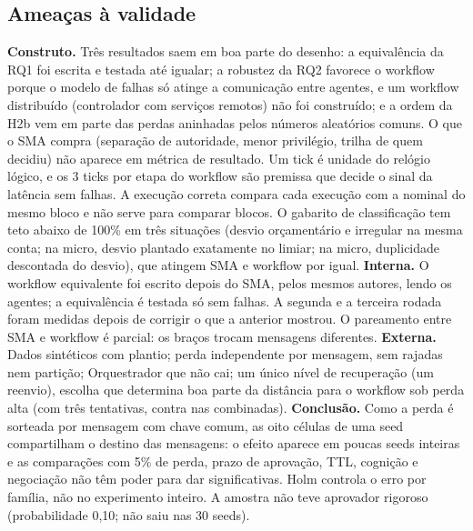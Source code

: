 \documentclass[10pt,a4paper]{article}
\begin{document}
\subsection{Ameaças à validade}\label{sec:ameacas}
\textbf{Construto.} Três resultados saem em boa parte do desenho: a equivalência da RQ1 foi escrita e testada até
igualar; a robustez da RQ2 favorece o workflow porque o modelo de falhas só atinge a comunicação entre agentes, e um
workflow distribuído (controlador com serviços remotos) não foi construído; e a ordem da H2b vem em parte das perdas
aninhadas pelos números aleatórios comuns. O que o SMA compra (separação de autoridade, menor privilégio, trilha de quem
decidiu) não aparece em métrica de resultado. Um tick é unidade do relógio lógico, e os 3 ticks por etapa do workflow são
premissa que decide o sinal da latência sem falhas. A execução correta compara cada execução com a nominal do mesmo
bloco e não serve para comparar blocos. O gabarito de classificação tem teto abaixo de 100\% em três
situações (desvio orçamentário e irregular na mesma conta; na micro, desvio plantado exatamente no limiar; na micro,
duplicidade descontada do desvio), que atingem SMA e workflow por igual. \textbf{Interna.} O workflow equivalente foi
escrito depois do SMA, pelos mesmos autores, lendo os agentes; a equivalência é testada só sem falhas. A segunda e a
terceira rodada foram medidas depois de corrigir o que a anterior mostrou. O pareamento entre SMA e workflow é parcial: os braços trocam mensagens
diferentes. \textbf{Externa.} Dados sintéticos com plantio; perda independente por mensagem, sem rajadas nem partição;
Orquestrador que não cai; um único nível de recuperação (um reenvio), escolha que determina boa parte da distância para
o workflow sob perda alta (com três tentativas,  contra  nas combinadas).
\textbf{Conclusão.} Como a perda é sorteada por mensagem com chave comum, as oito células de uma seed compartilham o
destino das mensagens: o efeito aparece em poucas seeds inteiras e as comparações com 5\% de perda, prazo de aprovação,
TTL, cognição e negociação não têm poder para dar significativas. Holm controla o erro por família, não no experimento
inteiro. A amostra não teve aprovador rigoroso (probabilidade
0,10; não saiu nas 30 seeds).

\end{document}
